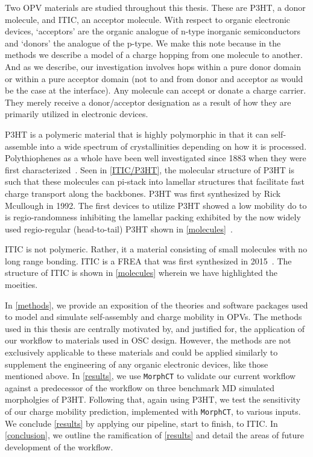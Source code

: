 Two OPV materials are studied throughout this thesis.
These are P3HT, a
donor molecule, and ITIC, an acceptor molecule. With respect to organic electronic devices, `acceptors' are the
organic analogue of n-type inorganic semiconductors and `donors' the analogue
of the p-type. We make this note because in the methods we describe a model of
a charge hopping from one molecule to another. And as we describe, our
investigation involves hops within a pure donor domain or within a pure
acceptor domain (not to and from donor and acceptor as would be the case at the interface). 
Any molecule can accept or donate a charge carrier.
They merely receive a donor/acceptor designation as a result of how they
are primarily utilized in electronic devices. 

P3HT is a polymeric material that is highly polymorphic in that it can self-assemble into a wide spectrum of
crystallinities depending on how it is processed.
Polythiophenes as a whole have been well investigated 
since 1883 when they were first characterized~\cite{Poelking2014}.
Seen in \autoref{ITIC/P3HT}, the molecular structure of P3HT
is such that these molecules can pi-stack into lamellar structures that facilitate fast charge transport along
the backbones. P3HT was first synthesized by Rick Mcullough in 1992. The first devices to utilize P3HT showed
a low mobility do to is regio-randomness inhibiting the lamellar packing exhibited by the now widely used
regio-regular (head-to-tail) P3HT shown in \autoref{molecules}~\cite{Zaumseil2014}. 

ITIC is not polymeric. Rather, it a material consisting of small molecules with no long range bonding.
ITIC is a FREA that was first synthesized in 2015~\cite{Bai201U}. The structure of ITIC is shown in
\autoref{molecules} wherein we have highlighted the moeities.  

In \autoref{methods}, we
provide an exposition of the theories and software packages used to model and simulate self-assembly and charge mobility in
OPVs.
The methods used in this thesis are centrally motivated by, and justified for, 
the application of our workflow to materials
used in OSC design. However, the methods are
not exclusively applicable to these materials and could be applied similarly to supplement the engineering of any organic
electronic devices, like those mentioned above. 
In \autoref{results}, we use \texttt{MorphCT} to validate our current workflow against a predecessor of the 
workflow on three benchmark MD simulated morpholgies of P3HT. 
Following that, again using P3HT, we test the sensitivity of our charge mobility prediction, 
implemented with \texttt{MorphCT}, to various inputs. We conclude \autoref{results} by applying our pipeline,
start to finish, to ITIC. 
In \autoref{conclusion}, we outline the ramification of \autoref{results} and detail the areas of future development of the workflow. 

